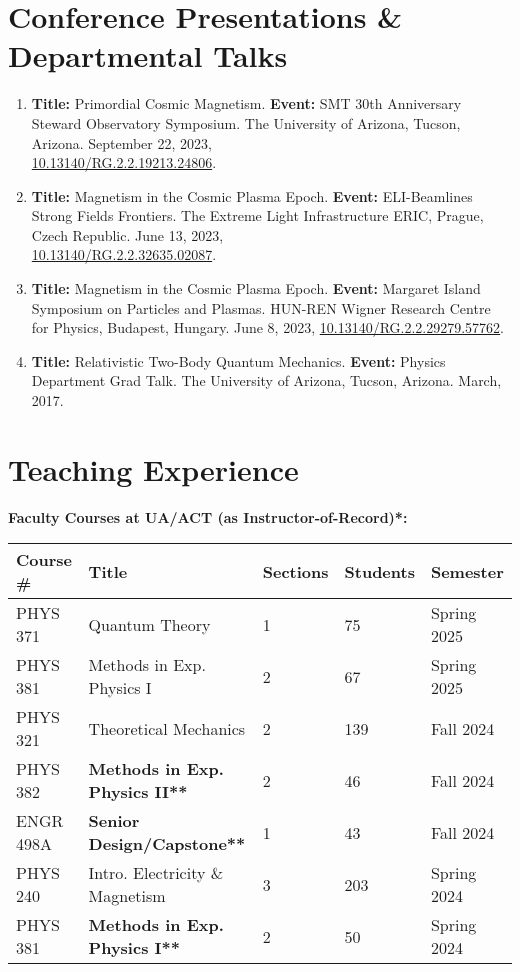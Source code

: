 \documentclass[11pt]{article}
\begin{document}
\section*{Conference Presentations \& Departmental Talks}
\begin{enumerate}[leftmargin=*,nosep]
    \item \textbf{Title:} Primordial Cosmic Magnetism. \textbf{Event:} SMT 30th Anniversary Steward Observatory Symposium. The University of Arizona, Tucson, Arizona. September 22, 2023,\\ \href{http://dx.doi.org/10.13140/RG.2.2.19213.24806}{10.13140/RG.2.2.19213.24806}.
    \item \textbf{Title:} Magnetism in the Cosmic Plasma Epoch. \textbf{Event:} ELI-Beamlines Strong Fields Frontiers. The Extreme Light Infrastructure ERIC, Prague, Czech Republic. June 13, 2023,\\ \href{http://dx.doi.org/10.13140/RG.2.2.32635.02087}{10.13140/RG.2.2.32635.02087}.
    \item \textbf{Title:} Magnetism in the Cosmic Plasma Epoch. \textbf{Event:} Margaret Island Symposium on Particles and Plasmas. HUN-REN Wigner Research Centre for Physics, Budapest, Hungary. June 8, 2023, \href{http://dx.doi.org/10.13140/RG.2.2.29279.57762}{10.13140/RG.2.2.29279.57762}.
    \item \textbf{Title:} Relativistic Two-Body Quantum Mechanics. \textbf{Event:} Physics Department Grad Talk. The University of Arizona, Tucson, Arizona. March, 2017.
\end{enumerate}

\section*{Teaching Experience}
\textbf{Faculty Courses at UA/ACT (as Instructor-of-Record)*:}\\
{\normalsize
\begin{tabular}{@{}p{2.2cm} p{6.0cm} p{2.0cm} p{2.0cm} p{2.8cm}@{}}
\toprule
\textbf{Course \#} & \textbf{Title} & \textbf{Sections} & \textbf{Students} & \textbf{Semester} \\
\midrule
PHYS 371   & Quantum Theory                    & 1 & 75  & Spring 2025 \\
PHYS 381   & Methods in Exp. Physics I         & 2 & 67  & Spring 2025 \\
PHYS 321   & Theoretical Mechanics             & 2 & 139 & Fall 2024 \\
PHYS 382   & \textbf{Methods in Exp. Physics II**}       & 2 & 46  & Fall 2024 \\
ENGR 498A  & \textbf{Senior Design/Capstone**}           & 1 & 43  & Fall 2024 \\
PHYS 240   & Intro. Electricity \& Magnetism    & 3 & 203 & Spring 2024 \\
PHYS 381   & \textbf{Methods in Exp. Physics I**}        & 2 & 50  & Spring 2024 \\
\bottomrule
\end{tabular}
}
\end{document}
